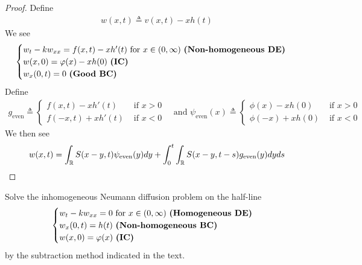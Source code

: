 \documentclass{report}
\begin{document}
\begin{proof}
Define
\begin{align*}
w(x,t)\triangleq v(x,t)-xh(t)
\end{align*}
We see 
\begin{align*}
\begin{cases}
  w_t-kw_{xx}=f(x,t)-xh'(t)\text{ for }x\in (0,\infty)\text{ \textbf{(Non-homogeneous DE)} }\\
  w(x,0)=\phi (x)-xh(0)\text{ \textbf{(IC)} }\\
  w_x(0,t)=0\text{ \textbf{(Good BC)} }
\end{cases}
\end{align*}
Define 
\begin{align*}
g_{\operatorname{even}}\triangleq \begin{cases}
  f(x,t)-xh'(t)& \text{ if $x>0$ }\\
  f(-x,t)+xh'(t)& \text{ if $x<0$ }
\end{cases}\text{ and }\psi_{\operatorname{even}}(x)\triangleq \begin{cases}
  \phi (x)-xh(0)& \text{ if $x>0$ }\\
  \phi (-x)+xh(0)& \text{ if $x<0$ }
\end{cases}
\end{align*}
We then see 
\begin{align*}
w(x,t)=\int_{\R}S(x-y,t)\psi_{\operatorname{even}}(y)dy + \int_0^t \int_{\R} S(x-y,t-s)g_{\operatorname{even}}(y)dyds
\end{align*}
\end{proof}
\begin{question}{}{}
Solve the inhomogeneous Neumann diffusion problem on the half-line
\begin{align*}
\begin{cases}
  w_t-kw_{xx}=0\text{ for }x\in (0,\infty)\text{ \textbf{(Homogeneous DE)}}\\
  w_x(0,t)=h(t)\text{ \textbf{(Non-homogeneous BC)} }\\
  w(x,0)= \phi (x) \text{ \textbf{(IC)} }
\end{cases}
\end{align*}
by the subtraction method indicated in the text.
\end{question}
\end{document}
